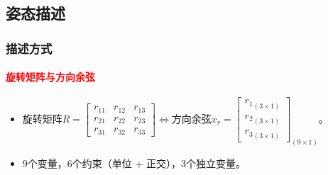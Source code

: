 \documentclass[
12pt, %
a4paper, 
oneside, %
]{scrartcl}
\begin{document}
\subsection[姿态描述]{姿态描述}
\subsubsection[描述方式]{描述方式}
\paragraph{\textcolor{red}{旋转矩阵与方向余弦}}
\begin{itemize}
\item 旋转矩阵$ R = \begin{bmatrix} r_{11} & r_{12} & r_{13} \\ r_{21} & r_{22} & r_{23} \\ r_{31} & r_{32} & r_{33} \end{bmatrix} $$ \Leftrightarrow $方向余弦$ x_r = \begin{bmatrix} {r_1}_{(3 \times 1)} \\ {r_2}_{(3 \times 1)} \\ {r_3}_{(3 \times 1)} \end{bmatrix}_{(9 \times 1)} $。
\item $ 9 $个变量，$ 6 $个约束（单位 + 正交），$ 3 $个独立变量。
\end{itemize}
\end{document}
